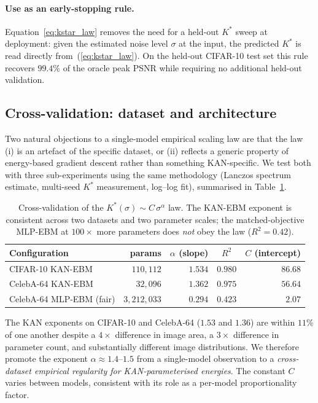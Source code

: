 \documentclass{article}
\begin{document}
\paragraph{Use as an early-stopping rule.} Equation~\ref{eq:kstar_law} removes
the need for a held-out $K^{*}$ sweep at deployment: given the estimated noise
level $\sigma$ at the input, the predicted $K^{*}$ is read directly
from~(\ref{eq:kstar_law}). On the held-out CIFAR-10 test set this rule recovers
$99.4\%$ of the oracle peak PSNR while requiring no additional held-out
validation.

\subsection{Cross-validation: dataset and architecture}
\label{sec:kstar-cross}

Two natural objections to a single-model empirical scaling law are that the law
(i) is an artefact of the specific dataset, or (ii) reflects a generic property
of energy-based gradient descent rather than something KAN-specific. We test
both with three sub-experiments using the same methodology (Lanczos spectrum
estimate, multi-seed $K^{*}$ measurement, log--log fit), summarised in
Table~\ref{tab:kstar_cross}.

\begin{table}[t]
\centering\small
\begin{tabular}{lrrcr}
\toprule
Configuration & params & $\alpha$ (slope) & $R^{2}$ & $C$ (intercept) \\
\midrule
CIFAR-10 KAN-EBM       & $110{,}112$ & $1.534$ & $0.980$ & $86.68$ \\
CelebA-64 KAN-EBM      &  $32{,}096$ & $1.362$ & $0.975$ & $56.64$ \\
CelebA-64 MLP-EBM (fair)& $3{,}212{,}033$ & $0.294$ & $0.423$ & $2.07$ \\
\bottomrule
\end{tabular}
\caption{Cross-validation of the $K^{*}(\sigma) \sim C\,\sigma^{\alpha}$ law.
The KAN-EBM exponent is consistent across two datasets and two parameter scales;
the matched-objective MLP-EBM at $100\times$ more parameters does \emph{not}
obey the law ($R^{2}{=}0.42$).}
\label{tab:kstar_cross}
\end{table}

The KAN exponents on CIFAR-10 and CelebA-64 ($1.53$ and $1.36$) are within
$11\%$ of one another despite a $4\times$ difference in image area, a $3\times$
difference in parameter count, and substantially different image distributions.
We therefore promote the exponent $\alpha\approx 1.4$--$1.5$ from a single-model
observation to a \emph{cross-dataset empirical regularity for KAN-parameterised
energies}. The constant $C$ varies between models, consistent with its role as
a per-model proportionality factor.
\end{document}

